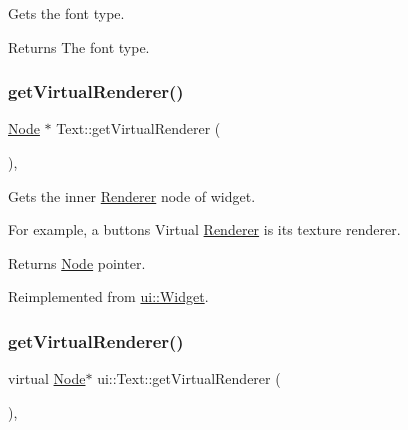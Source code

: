 Gets the font type. \begin{DoxyReturn}{Returns}
The font type. 
\end{DoxyReturn}
\mbox{\label{classui_1_1Text_a4a1e00d5f586e01d94c8dec146741dce}} 
\subsubsection{\texorpdfstring{get\+Virtual\+Renderer()}{getVirtualRenderer()}\hspace{0.1cm}{\footnotesize\ttfamily [1/2]}}
{\footnotesize\ttfamily \hyperlink{classNode}{Node} $\ast$ Text\+::get\+Virtual\+Renderer (\begin{DoxyParamCaption}{ }\end{DoxyParamCaption})\hspace{0.3cm}{\ttfamily [override]}, {\ttfamily [virtual]}}

Gets the inner \hyperlink{classRenderer}{Renderer} node of widget.

For example, a button\textquotesingle{}s Virtual \hyperlink{classRenderer}{Renderer} is it\textquotesingle{}s texture renderer.

\begin{DoxyReturn}{Returns}
\hyperlink{classNode}{Node} pointer. 
\end{DoxyReturn}


Reimplemented from \hyperlink{classui_1_1Widget_acf862bf9235fbb3823819eeb65d46f25}{ui\+::\+Widget}.

\mbox{\label{classui_1_1Text_ab595ff0bd28a29005e7f60ea662e7640}} 
\subsubsection{\texorpdfstring{get\+Virtual\+Renderer()}{getVirtualRenderer()}\hspace{0.1cm}{\footnotesize\ttfamily [2/2]}}
{\footnotesize\ttfamily virtual \hyperlink{classNode}{Node}$\ast$ ui\+::\+Text\+::get\+Virtual\+Renderer (\begin{DoxyParamCaption}{ }\end{DoxyParamCaption})\hspace{0.3cm}{\ttfamily [override]}, {\ttfamily [virtual]}}

